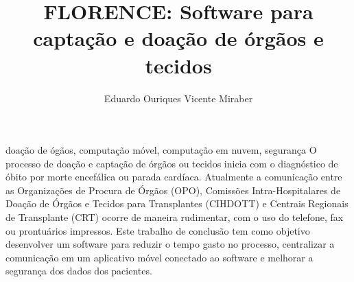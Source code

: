 \documentclass[portuguese,oneside]{tcc}
\author{Eduardo Ouriques \linebreak  Vicente Miraber}
\title{FLORENCE: Software para captação e doação de órgãos e tecidos}
      {FLORENCE: Software for capture and donation of organs and tissues}
\begin{document}






\begin{resumo}{doação de ógãos, computação móvel, computação em nuvem, segurança}
O processo de doação e captação de órgãos ou tecidos inicia com o diagnóstico de óbito por morte encefálica ou parada cardíaca. Atualmente a comunicação entre as Organizações de Procura de Órgãos (OPO), Comissões Intra-Hospitalares de Doação de Órgãos e Tecidos para Transplantes (CIHDOTT) e Centrais Regionais de Transplante (CRT) ocorre de maneira rudimentar, com o uso do telefone, fax ou prontuários impressos. Este trabalho de conclusão tem como objetivo desenvolver um software para reduzir o tempo gasto no processo, centralizar a comunicação em um aplicativo móvel conectado ao software e melhorar a segurança dos dados dos pacientes.


\end{resumo}
\end{document}
